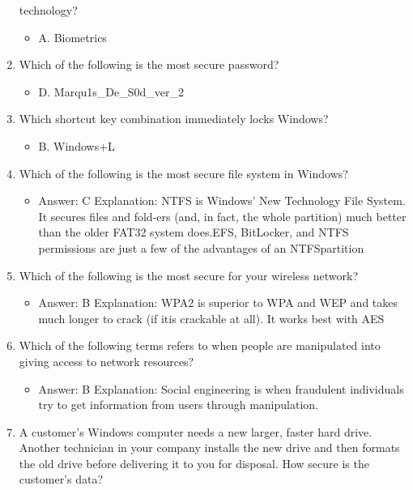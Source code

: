 \documentclass{article}
\begin{document}
\begin{enumerate}
technology?
     \begin{itemize}
         \item A. Biometrics
     \end{itemize}
     \item Which of the following is the most secure password?
     \begin{itemize}
         \item D. Marqu1s\_De\_S0d\_ver\_2
     \end{itemize}
     \item Which shortcut key combination immediately locks Windows?
     \begin{itemize}
         \item B. Windows+L
     \end{itemize}
     \item Which of the following is the most secure file system in Windows?
     \begin{itemize}
         \item Answer:   C Explanation:        NTFS is Windows’ New Technology File System. It secures files and fold-ers (and, in fact, the whole partition) much better than the older FAT32 system does.EFS, BitLocker, and NTFS permissions are just a few of the advantages of an NTFSpartition
     \end{itemize}
     \item Which of the following is the most secure for your wireless
network?
     \begin{itemize}
         \item Answer:   B        Explanation:        WPA2 is superior to WPA and WEP and takes much longer to crack (if itis crackable at all). It works best with AES
     \end{itemize}
     \item Which of the following terms refers to when people are
manipulated into giving access to network resources?
     \begin{itemize}
         \item Answer:   B        Explanation:        Social engineering is when fraudulent individuals try to get information from users through manipulation.
     \end{itemize}
     \item A customer’s Windows computer needs a new larger, faster hard
drive. Another technician in your company installs the new drive
and then formats the old drive before delivering it to you for
disposal. How secure is the customer’s data?
     \begin{itemize}

\end{itemize}
\end{enumerate}
\end{document}
